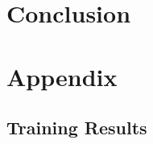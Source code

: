 \documentclass{article}
\begin{document}
\section{Conclusion}
\label{conclusion}



\section{Appendix}
\label{appendix}

\subsection{Training Results}


{
\small



}

\end{document}

